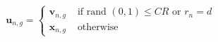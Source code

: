 \begin{equation}
\mathbf{u}_{n,g}=\left\{\begin{array}{ll}{\mathbf{v}_{n,g}} & {\text { if rand }(0,1) \leq C R \text { or } r_{n}=d} \\ {\mathbf{x}_{n,g}} & {\text { otherwise }}\end{array}\right.
\label{cross-over}
\end{equation}